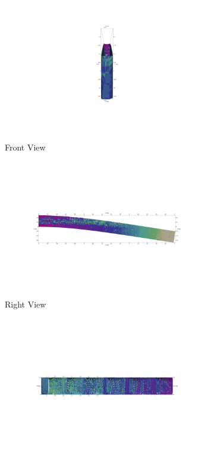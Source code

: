 \documentclass[a4paper,11pt]{article}
\begin{document}
\begin{figure}[h!]
	\begin{subfigure}[b]{0.5\linewidth}
		\centering
		\includegraphics[width=\linewidth]{picture/conference/3dslice4}
		\caption{Front View}
	\end{subfigure}
	\quad
	\begin{subfigure}[b]{0.5\linewidth}
		\centering
		\includegraphics[width=\linewidth]{picture/conference/3dslice6}
		\caption{Right View}
	\end{subfigure}
	\quad
	\begin{subfigure}[b]{0.5\linewidth}
		\centering
		\includegraphics[width=\linewidth]{picture/conference/3dslice8}

\end{subfigure}
\end{figure}
\end{document}

